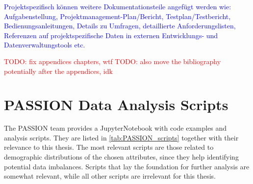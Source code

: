 \documentclass[12pt, a4paper, oneside]{book}   	%
\renewcommand{\todo}[1]{\textcolor{red}{TODO: #1}}
\newcommand{\baaCriteria}[1]{\textcolor{blue}{#1}}
\begin{document}
		
		\newpage
		\appendix
		\begin{appendices}
			\baaCriteria{Projektspezifisch können weitere Dokumentationsteile angefügt werden wie: Aufgabenstellung, Projektmanagement-Plan/Bericht, Testplan/Testbericht, Bedienungsanleitungen, Details zu Umfragen, detaillierte Anforderungslisten, Referenzen auf projektspezifische Daten in externen Entwicklungs- und Datenverwaltungstools etc.}
			
			\todo{fix appendices chapters, wtf}
			\todo{also move the bibliography potentially after the appendices, idk}
		
	
			\chapter{PASSION Data Analysis Scripts}\label{app:PASSIONdataAnalysisScripts}
			The PASSION team provides a \gls{JupyterNotebook} with code examples and analysis scripts. They are listed in \autoref{tab:PASSION_scripts} together with their relevance to this thesis. The most relevant scripts are those related to demographic distributions of the chosen attributes, since they help identifying potential data imbalances. Scripts that lay the foundation for further analysis are somewhat relevant, while all other scripts are irrelevant for this thesis.
			

\end{appendices}
\end{document}
